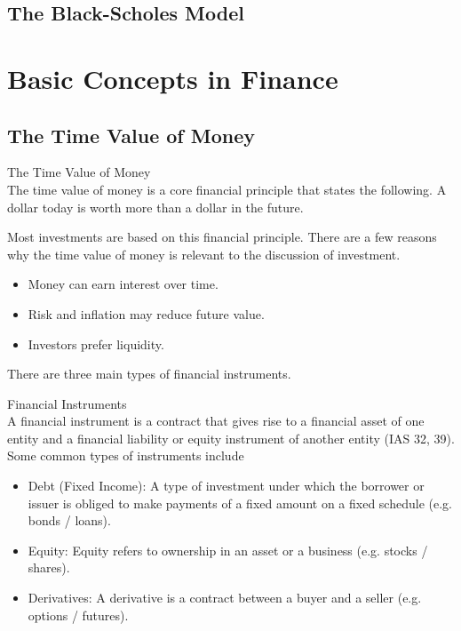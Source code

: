 \documentclass[a4paper]{article}
\begin{document}
\subsection{The Black-Scholes Model}

\pagebreak
\section{Basic Concepts in Finance}
\subsection{The Time Value of Money}
\begin{cpt}{The Time Value of Money}{}\\
The time value of money is a core financial principle that states the following. A dollar today is worth more than a dollar in the future. 
\end{cpt}

Most investments are based on this financial principle. There are a few reasons why the time value of money is relevant to the discussion of investment. 
\begin{itemize}
\item Money can earn interest over time. 
\item Risk and inflation may reduce future value. 
\item Investors prefer liquidity. 
\end{itemize}

There are three main types of financial instruments. 

\begin{cpt}{Financial Instruments}{}\\
A financial instrument is a contract that gives rise to a financial asset of one entity and a financial liability or equity instrument of another entity (IAS 32, 39). Some common types of instruments include
\begin{itemize}
\item Debt (Fixed Income): A type of investment under which the borrower or issuer is obliged to make payments of a fixed amount on a fixed schedule (e.g. bonds / loans). 
\item Equity: Equity refers to ownership in an asset or a business (e.g. stocks / shares). 
\item Derivatives: A derivative is a contract between a buyer and a seller (e.g. options / futures). 
\end{itemize}
\end{cpt}
\end{document}
